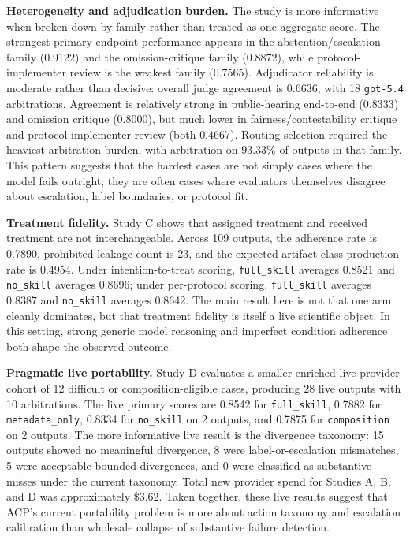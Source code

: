 \documentclass[11pt]{article}
\begin{document}
\vspace{0.1in}
\textbf{Heterogeneity and adjudication burden.} The study is more informative when broken down by family rather than treated as one aggregate score. The strongest primary endpoint performance appears in the abstention/escalation family (0.9122) and the omission-critique family (0.8872), while protocol-implementer review is the weakest family (0.7565). Adjudicator reliability is moderate rather than decisive: overall judge agreement is 0.6636, with 18 \texttt{gpt-5.4} arbitrations. Agreement is relatively strong in public-hearing end-to-end (0.8333) and omission critique (0.8000), but much lower in fairness/contestability critique and protocol-implementer review (both 0.4667). Routing selection required the heaviest arbitration burden, with arbitration on 93.33\% of outputs in that family. This pattern suggests that the hardest cases are not simply cases where the model fails outright; they are often cases where evaluators themselves disagree about escalation, label boundaries, or protocol fit.

\vspace{0.1in}
\textbf{Treatment fidelity.} Study C shows that assigned treatment and received treatment are not interchangeable. Across 109 outputs, the adherence rate is 0.7890, prohibited leakage count is 23, and the expected artifact-class production rate is 0.4954. Under intention-to-treat scoring, \texttt{full\_skill} averages 0.8521 and \texttt{no\_skill} averages 0.8696; under per-protocol scoring, \texttt{full\_skill} averages 0.8387 and \texttt{no\_skill} averages 0.8642. The main result here is not that one arm cleanly dominates, but that treatment fidelity is itself a live scientific object. In this setting, strong generic model reasoning and imperfect condition adherence both shape the observed outcome.

\vspace{0.1in}
\textbf{Pragmatic live portability.} Study D evaluates a smaller enriched live-provider cohort of 12 difficult or composition-eligible cases, producing 28 live outputs with 10 arbitrations. The live primary scores are 0.8542 for \texttt{full\_skill}, 0.7882 for \texttt{metadata\_only}, 0.8334 for \texttt{no\_skill} on 2 outputs, and 0.7875 for \texttt{composition} on 2 outputs. The more informative live result is the divergence taxonomy: 15 outputs showed no meaningful divergence, 8 were label-or-escalation mismatches, 5 were acceptable bounded divergences, and 0 were classified as substantive misses under the current taxonomy. Total new provider spend for Studies A, B, and D was approximately \$3.62. Taken together, these live results suggest that ACP's current portability problem is more about action taxonomy and escalation calibration than wholesale collapse of substantive failure detection.
\end{document}
